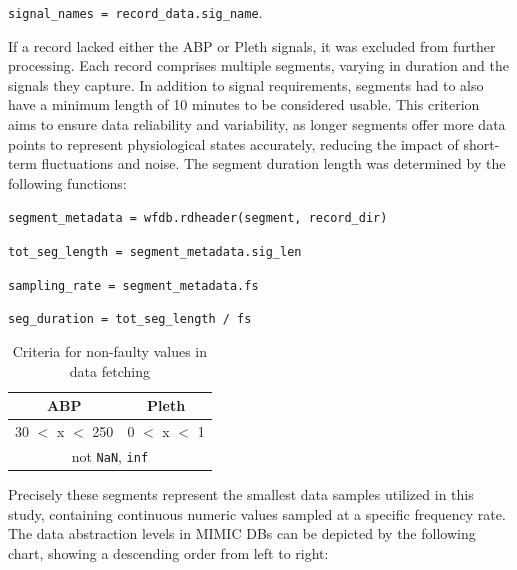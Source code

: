\vspace{0.1cm}
{\centering \texttt{signal\_names = record\_data.sig\_name}.\par}
\vspace{0.1cm}

\noindent If a record lacked either the ABP or Pleth signals, it was excluded from further processing.
Each record comprises multiple segments, varying in duration and the signals they capture.
In addition to signal requirements, segments had to also have a minimum length of 10 minutes to be considered usable.
This criterion aims to ensure data reliability and variability, as longer segments offer more data points to represent physiological states accurately, reducing the impact of short-term fluctuations and noise.
The segment duration length was determined by the following functions:

\vspace{0.1cm}
\qquad\qquad\qquad \texttt{segment\_metadata = wfdb.rdheader(segment, record\_dir)}

\qquad\qquad\qquad \texttt{tot\_seg\_length = segment\_metadata.sig\_len}

\qquad\qquad\qquad \texttt{sampling\_rate = segment\_metadata.fs}

\qquad\qquad\qquad \texttt{seg\_duration = tot\_seg\_length / fs}

\begin{table}
    \vspace{-1cm}
    \begin{center}
        \begin{tabular}{ |c|c| }
            \hline
            ABP              & Pleth         \\
            \hline
            30 $<$ x $<$ 250 & 0 $<$ x $<$ 1 \\
            \hline
            \multicolumn{2}{|c|}{not \texttt{NaN}, \texttt{inf}} \\
            \hline
        \end{tabular}
    \end{center}
    \vspace*{-7mm}
    \captionsetup{format=plain, justification=centering, font=small}
    \caption{Criteria for non-faulty values in data fetching}
    \label{tab:faulty}
\end{table}

\noindent Precisely these segments represent the smallest data samples utilized in this study, containing continuous numeric values sampled at a specific frequency rate.
The data abstraction levels in MIMIC DBs can be depicted by the following chart, showing a descending order from left to right:

